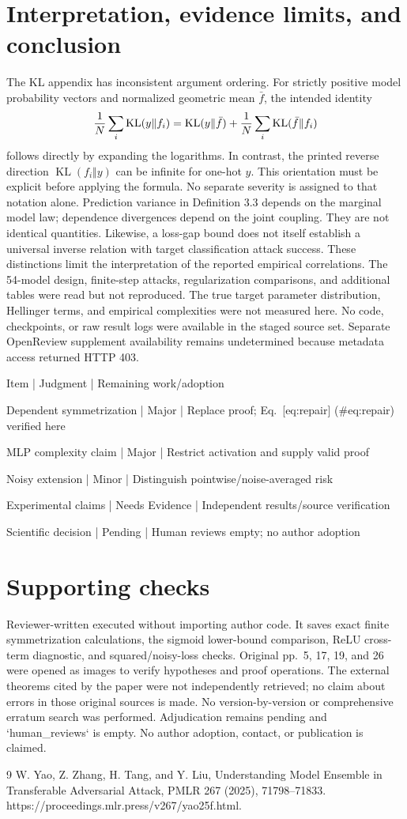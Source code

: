 \documentclass[10pt]{article}
\begin{document}
\section*{Interpretation, evidence limits, and conclusion}
The KL appendix has inconsistent argument ordering. For strictly positive model probability vectors and normalized geometric mean \(\bar f\), the intended identity \[\frac1N\sum_i{\rm KL}(y\Vert f_i)
 ={\rm KL}(y\Vert\bar f)+\frac1N\sum_i{\rm KL}(\bar f\Vert f_i)\] follows directly by expanding the logarithms. In contrast, the printed reverse direction \(\operatorname{KL}(f_i\Vert y)\) can be infinite for one-hot \(y\). This orientation must be explicit before applying the formula. No separate severity is assigned to that notation alone. Prediction variance in Definition 3.3 depends on the marginal model law; dependence divergences depend on the joint coupling. They are not identical quantities. Likewise, a loss-gap bound does not itself establish a universal inverse relation with target classification attack success. These distinctions limit the interpretation of the reported empirical correlations. The 54-model design, finite-step attacks, regularization comparisons, and additional tables were read but not reproduced. The true target parameter distribution, Hellinger terms, and empirical complexities were not measured here. No code, checkpoints, or raw result logs were available in the staged source set. Separate OpenReview supplement availability remains undetermined because metadata access returned HTTP 403.\par
Item | Judgment | Remaining work/adoption\par
Dependent symmetrization | Major | Replace proof; Eq. [eq:repair] (\#eq:repair) verified here\par
MLP complexity claim | Major | Restrict activation and supply valid proof\par
Noisy extension | Minor | Distinguish pointwise/noise-averaged risk\par
Experimental claims | Needs Evidence | Independent results/source verification\par
Scientific decision | Pending | Human reviews empty; no author adoption\par
\section*{Supporting checks}
Reviewer-written executed without importing author code. It saves exact finite symmetrization calculations, the sigmoid lower-bound comparison, ReLU cross-term diagnostic, and squared/noisy-loss checks. Original pp. 5, 17, 19, and 26 were opened as images to verify hypotheses and proof operations. The external theorems cited by the paper were not independently retrieved; no claim about errors in those original sources is made. No version-by-version or comprehensive erratum search was performed. Adjudication remains pending and `human\_reviews` is empty. No author adoption, contact, or publication is claimed.\par
9 W. Yao, Z. Zhang, H. Tang, and Y. Liu, Understanding Model Ensemble in Transferable Adversarial Attack, PMLR 267 (2025), 71798–71833. https://proceedings.mlr.press/v267/yao25f.html.\par
\end{document}

